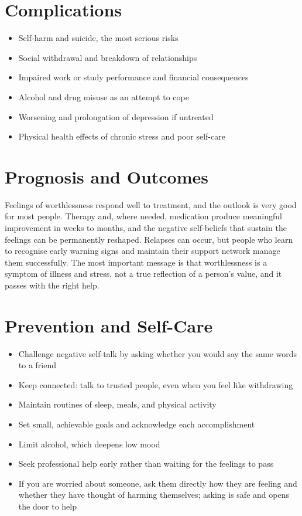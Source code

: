 \section*{Complications}
\begin{itemize}
    \item Self-harm and suicide, the most serious risks
    \item Social withdrawal and breakdown of relationships
    \item Impaired work or study performance and financial consequences
    \item Alcohol and drug misuse as an attempt to cope
    \item Worsening and prolongation of depression if untreated
    \item Physical health effects of chronic stress and poor self-care
\end{itemize}

\section*{Prognosis and Outcomes}
Feelings of worthlessness respond well to treatment, and the outlook is very good for most people. Therapy and, where needed, medication produce meaningful improvement in weeks to months, and the negative self-beliefs that sustain the feelings can be permanently reshaped. Relapses can occur, but people who learn to recognise early warning signs and maintain their support network manage them successfully. The most important message is that worthlessness is a symptom of illness and stress, not a true reflection of a person's value, and it passes with the right help.

\section*{Prevention and Self-Care}
\begin{itemize}
    \item Challenge negative self-talk by asking whether you would say the same words to a friend
    \item Keep connected: talk to trusted people, even when you feel like withdrawing
    \item Maintain routines of sleep, meals, and physical activity
    \item Set small, achievable goals and acknowledge each accomplishment
    \item Limit alcohol, which deepens low mood
    \item Seek professional help early rather than waiting for the feelings to pass
    \item If you are worried about someone, ask them directly how they are feeling and whether they have thought of harming themselves; asking is safe and opens the door to help
\end{itemize}

